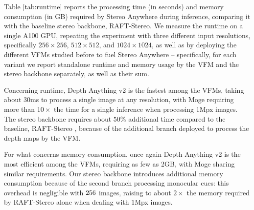 \documentclass[10pt,twocolumn,letterpaper]{article}
\newcommand{\method}[0]{Stereo Anywhere\xspace}
\begin{document}
\label{subsec:runtime}
Table \ref{tab:runtime} reports the processing time (in seconds) and memory consumption (in GB) required by \method during inference, comparing it with the baseline stereo backbone, RAFT-Stereo.
We measure the runtime on a single A100 GPU, repeating the experiment with three different input resolutions, specifically $256\times256$, $512\times512$, and $1024\times1024$, as well as by deploying the different VFMs studied before to fuel \method{} -- specifically, for each variant we report standalone runtime and memory usage by the VFM and the stereo backbone separately, as well as their sum.

Concerning runtime, Depth Anything v2 is the fastest among the VFMs, taking about 30ms to process a single image at any resolution, with Moge requiring more than $10\times$ the time for a single inference when processing 1Mpx images.
The stereo backbone requires about 50\% additional time compared to the baseline, RAFT-Stereo \cite{lipson2021raft}, because of the additional branch deployed to process the depth maps by the VFM.

For what concerns memory consumption, once again Depth Anything v2 is the most efficient among the VFMs, requiring as few as 2GB, with Moge sharing similar requirements. Our stereo backbone introduces additional memory consumption because of the second branch processing monocular cues: this overhead is negligible with $256\time256$ images, raising to about $2\times$ the memory required by RAFT-Stereo alone when dealing with 1Mpx images.
\end{document}

